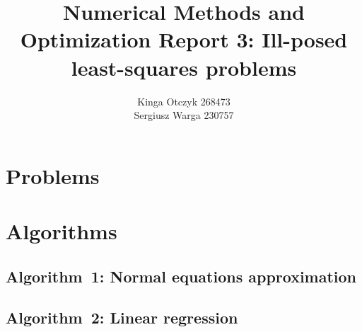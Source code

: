 \documentclass[a4paper]{article}
\title{Numerical Methods and Optimization Report 3:
Ill-posed least-squares problems}
\author{Kinga Otczyk 268473\\Sergiusz Warga 230757}
\begin{document}
\maketitle
\tableofcontents
\pagebreak

\section{Problems}








\clearpage

\section{Algorithms}
\subsection{Algorithm~1: Normal equations approximation}%
\label{algorithm:1}

\subsection{Algorithm~2: Linear regression}%
\label{algorithm:2}



\clearpage

\nocite{Zdunek, GoluVanl96, Meyer}


\end{document}
